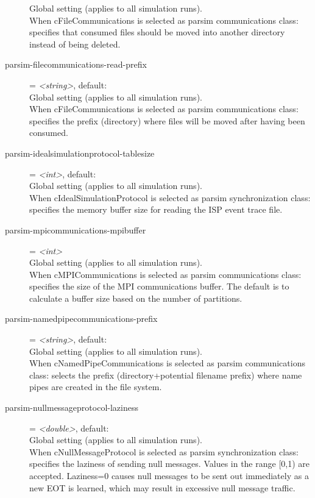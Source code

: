 \begin{description}
    Global setting (applies to all simulation runs).\\
    When cFileCommunications is selected as parsim communications class:
    specifies that consumed files should be moved into another directory
    instead of being deleted.
\item[parsim-filecommunications-read-prefix] = \textit{<string>}, default: \\
    Global setting (applies to all simulation runs).\\
    When cFileCommunications is selected as parsim communications class:
    specifies the prefix (directory) where files will be moved after having
    been consumed.
\item[parsim-idealsimulationprotocol-tablesize] = \textit{<int>}, default: \\
    Global setting (applies to all simulation runs).\\
    When cIdealSimulationProtocol is selected as parsim synchronization class:
    specifies the memory buffer size for reading the ISP event trace file.
\item[parsim-mpicommunications-mpibuffer] = \textit{<int>}\\
    Global setting (applies to all simulation runs).\\
    When cMPICommunications is selected as parsim communications class:
    specifies the size of the MPI communications buffer. The default is to
    calculate a buffer size based on the number of partitions.
\item[parsim-namedpipecommunications-prefix] = \textit{<string>}, default: \\
    Global setting (applies to all simulation runs).\\
    When cNamedPipeCommunications is selected as parsim communications class:
    selects the prefix (directory+potential filename prefix) where name pipes
    are created in the file system.
\item[parsim-nullmessageprotocol-laziness] = \textit{<double>}, default: \\
    Global setting (applies to all simulation runs).\\
    When cNullMessageProtocol is selected as parsim synchronization class:
    specifies the laziness of sending null messages. Values in the range [0,1)
    are accepted. Laziness=0 causes null messages to be sent out immediately as
    a new EOT is learned, which may result in excessive null message traffic.

\end{description}
